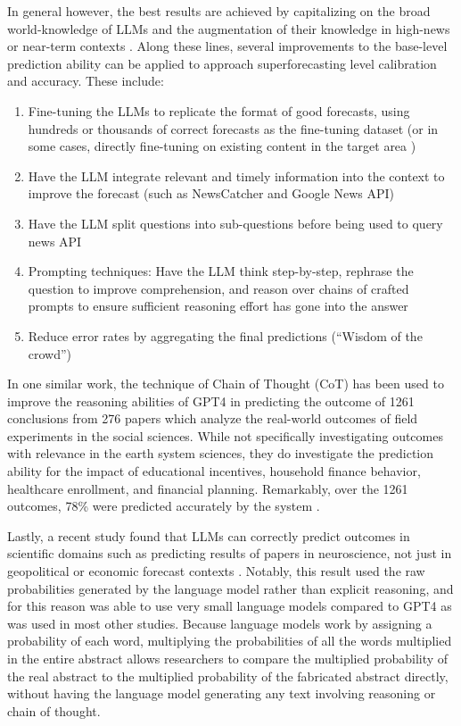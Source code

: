 \documentclass[12pt,a4paper]{article}
\begin{document}
In general however, the best results are achieved by capitalizing on the broad world-knowledge of LLMs and the augmentation of their knowledge in high-news or near-term contexts . Along these lines, several improvements to the base-level prediction ability can be applied to approach superforecasting level calibration and accuracy. These include: 
\begin{enumerate}
\item Fine-tuning the LLMs to replicate the format of good forecasts, using hundreds or thousands of correct forecasts as the fine-tuning dataset (or in some cases, directly fine-tuning on existing content in the target area )
\item Have the LLM integrate relevant and timely information into the context to improve the forecast (such as NewsCatcher and Google News API)
\item Have the LLM split questions into sub-questions before being used to query news API
\item Prompting techniques: Have the LLM think step-by-step, rephrase the question to improve comprehension, and reason over chains of crafted prompts to ensure sufficient reasoning effort has gone into the answer
\item Reduce error rates by aggregating the final predictions (``Wisdom of the crowd'')
\end{enumerate}


In one similar work, the technique of Chain of Thought (CoT) has been used to improve the reasoning abilities of GPT4 in predicting the outcome of 1261 conclusions from 276 papers which analyze the real-world outcomes of field experiments in the social sciences. While not specifically investigating outcomes with relevance in the earth system sciences, they do investigate the prediction ability for the impact of educational incentives, household finance behavior, healthcare enrollment, and financial planning. Remarkably, over the 1261 outcomes, 78\% were predicted accurately by the system .

Lastly, a recent study found that LLMs can correctly predict outcomes in scientific domains such as predicting results of papers in neuroscience, not just in geopolitical or economic forecast contexts . Notably, this result used the raw probabilities generated by the language model rather than explicit reasoning, and for this reason was able to use very small language models compared to GPT4 as was used in most other studies. Because language models work by assigning a probability of each word,  multiplying the probabilities of all the words multiplied in the entire abstract allows researchers to compare the multiplied probability of the real abstract to the multiplied probability of the fabricated abstract directly, without having the language model generating any text involving reasoning or chain of thought. 
\end{document}
